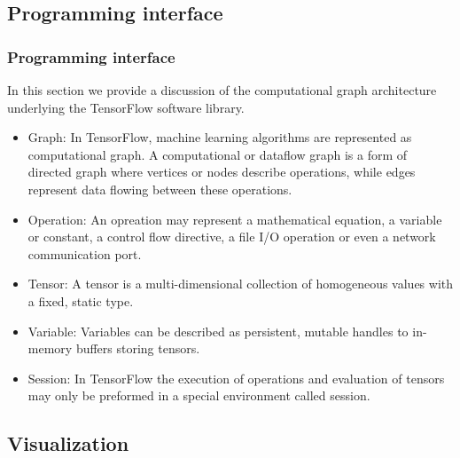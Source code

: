 \subsection{Programming interface}

\begin{frame}
  \MyLogo
  \frametitle{Programming interface}
  In this section we provide a discussion of the computational graph architecture underlying the TensorFlow software library.
  
  \begin{itemize}
	  	\item Graph: In TensorFlow, machine learning algorithms are represented as computational graph. A computational or dataflow graph is a form of directed graph where vertices or nodes describe operations, while edges represent data flowing between these operations.
	  	
	  	\item Operation: An opreation may represent a mathematical equation, a variable or constant, a control flow directive, a file I/O operation or even a network communication port.
	  	
	  	\item Tensor: A tensor is a multi-dimensional collection of homogeneous values with a fixed, static type.
	  	
	  	\item Variable: Variables can be described as persistent, mutable handles to in-memory buffers storing tensors.
	  	
	  	\item Session: In TensorFlow the execution of operations and evaluation of tensors may only be preformed in a special environment called session.
  \end{itemize}

\end{frame}

\subsection{Visualization}

